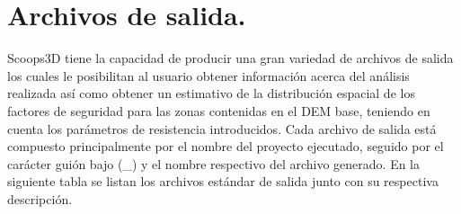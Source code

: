 \section{Archivos de salida.}
\label{chap: archivos de salida}
Scoops3D tiene la capacidad de producir una gran variedad de archivos de salida los
cuales le posibilitan al usuario obtener informaci\'{o}n acerca del an\'alisis realizada as\'{i} como
obtener un estimativo de la distribuci\'{o}n espacial de los factores de seguridad para las zonas
contenidas en el DEM base, teniendo en cuenta los par\'{a}metros de resistencia introducidos.
Cada archivo de salida est\'{a} compuesto principalmente por el nombre del proyecto ejecutado, seguido por el car\'{a}cter gui\'{o}n bajo (\_) y el nombre respectivo del archivo generado.
En la siguiente tabla se listan los archivos est\'{a}ndar de salida junto con su respectiva descripci\'{o}n.


